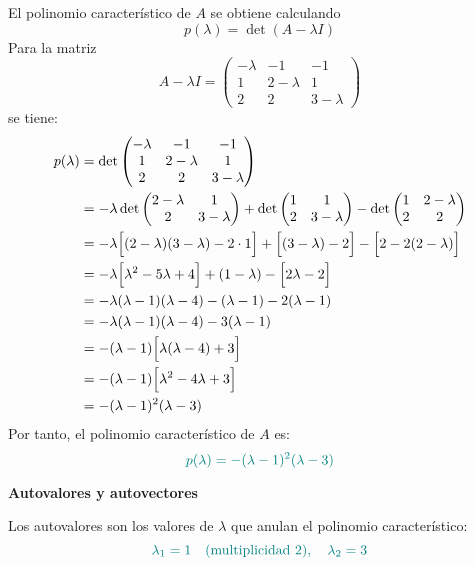 \documentclass{article}
\begin{document}
\begin{enumerate}[label=\textbf{\alph*)}]
    El polinomio característico de \( A \) se obtiene calculando
    \[
    p(\lambda) = \det(A - \lambda I)
    \]
    Para la matriz
    \[
    A - \lambda I =
    \begin{pmatrix}
    -\lambda & -1 & -1 \\
    1 & 2-\lambda & 1 \\
    2 & 2 & 3-\lambda
    \end{pmatrix}
    \]
    se tiene:
    \[
    \begin{aligned}
    p(\lambda) &= \det
    \begin{pmatrix}
    -\lambda & -1 & -1 \\
    1 & 2-\lambda & 1 \\
    2 & 2 & 3-\lambda
    \end{pmatrix} \\
    &= -\lambda \det
    \begin{pmatrix}
    2-\lambda & 1 \\
    2 & 3-\lambda
    \end{pmatrix}
    + \det
    \begin{pmatrix}
    1 & 1 \\
    2 & 3-\lambda
    \end{pmatrix}
    - \det
    \begin{pmatrix}
    1 & 2-\lambda \\
    2 & 2
    \end{pmatrix} \\
    &= -\lambda \Bigl[(2-\lambda)(3-\lambda)-2\cdot1\Bigr] + \Bigl[(3-\lambda)-2\Bigr] - \Bigl[2-2(2-\lambda)\Bigr] \\
    &= -\lambda \Bigl[\lambda^2-5\lambda+4\Bigr] + (1-\lambda) - \Bigl[2\lambda-2\Bigr] \\
    &= -\lambda(\lambda-1)(\lambda-4) - (\lambda-1) - 2(\lambda-1) \\
    &= -\lambda(\lambda-1)(\lambda-4) - 3(\lambda-1) \\
    &= -(\lambda-1)\Bigl[\lambda(\lambda-4)+3\Bigr] \\
    &= -(\lambda-1)\Bigl[\lambda^2-4\lambda+3\Bigr] \\
    &= -(\lambda-1)^2(\lambda-3)
    \end{aligned}
    \]
    Por tanto, el polinomio característico de \( A \) es:
    \[\color{teal}
    p(\lambda) = -(\lambda-1)^2(\lambda-3)
    \]
    
    \textbf{Autovalores y autovectores}
    
    Los autovalores son los valores de \( \lambda \) que anulan el polinomio característico:
    \[\color{teal}
    \lambda_1 = 1 \quad (\text{multiplicidad 2}), \quad \lambda_2 = 3
    \]
    

\end{enumerate}
\end{document}
